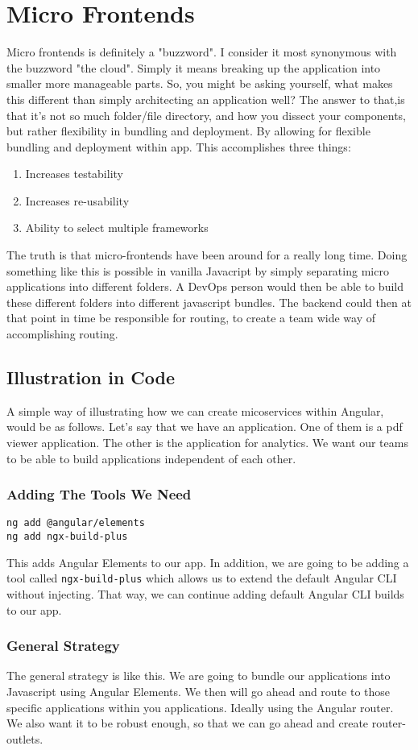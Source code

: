 \chapter{ Micro Frontends }
Micro frontends is definitely a "buzzword". I consider it most synonymous with the buzzword "the cloud". Simply it means breaking up the application into smaller more manageable parts. So, you might be asking yourself, what makes this different than simply architecting an application well? The answer to that,is that it's not so much folder/file directory, and how you dissect your components, but rather flexibility in bundling and deployment. By allowing for flexible bundling and deployment within app. This accomplishes three things: 
\begin{enumerate}
  \item Increases testability
  \item Increases re-usability
  \item Ability to select multiple frameworks
\end{enumerate}

The truth is that micro-frontends have been around for a really long time. Doing something like this is possible in vanilla Javacript by simply separating micro applications into different folders. A DevOps person would then be able to build these different folders into different javascript bundles. The backend could then at that point in time be responsible for routing, to create a team wide way of accomplishing routing. 

\section{Illustration in Code}
A simple way of illustrating how we can create micoservices within Angular, would be as follows. Let's say that we have an application. One of them is a pdf viewer application. The other is the application for analytics. We want our teams to be able to build applications independent of each other. 

\subsection{Adding The Tools We Need}
\begin{verbatim}
ng add @angular/elements
ng add ngx-build-plus
\end{verbatim}

This adds Angular Elements to our app. In addition, we are going to be adding a tool called \lstinline{ngx-build-plus} which allows us to extend the default Angular CLI without injecting. That way, we can continue adding default Angular CLI builds to our app. 

\subsection{General Strategy}
The general strategy is like this. We are going to bundle our applications into Javascript using Angular Elements. We then will go ahead and route to those specific applications within you applications. Ideally using the Angular router. We also want it to be robust enough, so that we can go ahead and create router-outlets. 
